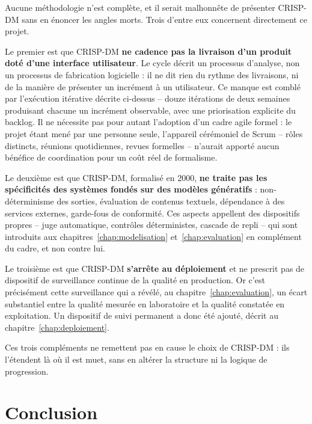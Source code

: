 Aucune méthodologie n'est complète, et il serait malhonnête de présenter CRISP-DM sans en énoncer les angles morts. Trois d'entre eux concernent directement ce projet.

Le premier est que CRISP-DM \textbf{ne cadence pas la livraison d'un produit doté d'une interface utilisateur}. Le cycle décrit un processus d'analyse, non un processus de fabrication logicielle : il ne dit rien du rythme des livraisons, ni de la manière de présenter un incrément à un utilisateur. Ce manque est comblé par l'exécution itérative décrite ci-dessus -- douze itérations de deux semaines produisant chacune un incrément observable, avec une priorisation explicite du backlog. Il ne nécessite pas pour autant l'adoption d'un cadre agile formel : le projet étant mené par une personne seule, l'appareil cérémoniel de Scrum -- rôles distincts, réunions quotidiennes, revues formelles -- n'aurait apporté aucun bénéfice de coordination pour un coût réel de formalisme.

Le deuxième est que CRISP-DM, formalisé en 2000, \textbf{ne traite pas les spécificités des systèmes fondés sur des modèles génératifs} : non-déterminisme des sorties, évaluation de contenus textuels, dépendance à des services externes, garde-fous de conformité. Ces aspects appellent des dispositifs propres -- juge automatique, contrôles déterministes, cascade de repli -- qui sont introduits aux chapitres~\ref{chap:modelisation} et~\ref{chap:evaluation} en complément du cadre, et non contre lui.

Le troisième est que CRISP-DM \textbf{s'arrête au déploiement} et ne prescrit pas de dispositif de surveillance continue de la qualité en production. Or c'est précisément cette surveillance qui a révélé, au chapitre~\ref{chap:evaluation}, un écart substantiel entre la qualité mesurée en laboratoire et la qualité constatée en exploitation. Un dispositif de suivi permanent a donc été ajouté, décrit au chapitre~\ref{chap:deploiement}.

Ces trois compléments ne remettent pas en cause le choix de CRISP-DM : ils l'étendent là où il est muet, sans en altérer la structure ni la logique de progression.

\section*{Conclusion}

